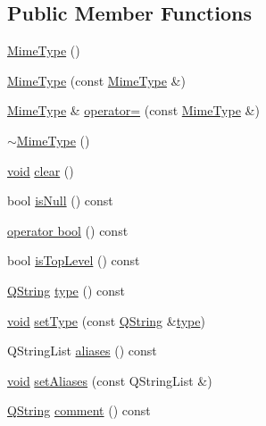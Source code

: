 \subsection*{Public Member Functions}
\begin{DoxyCompactItemize}
\item 
\hyperlink{group___core_plugin_ga4afb222f16010df4252caff7ca264214}{Mime\-Type} ()
\item 
\hyperlink{group___core_plugin_gaf3eef4f7d35c3f1cbf9b6531ad29f3f5}{Mime\-Type} (const \hyperlink{class_core_1_1_mime_type}{Mime\-Type} \&)
\item 
\hyperlink{class_core_1_1_mime_type}{Mime\-Type} \& \hyperlink{group___core_plugin_ga885539378c7538653aa56bc48b16ca48}{operator=} (const \hyperlink{class_core_1_1_mime_type}{Mime\-Type} \&)
\item 
\hyperlink{group___core_plugin_ga81931045febeb757dcd1fd43fb21d5fc}{$\sim$\-Mime\-Type} ()
\item 
\hyperlink{group___u_a_v_objects_plugin_ga444cf2ff3f0ecbe028adce838d373f5c}{void} \hyperlink{group___core_plugin_gae127b4f4a3fe982f3823c5227dd8d490}{clear} ()
\item 
bool \hyperlink{group___core_plugin_ga3b4f946e2b24082d83336ca0ceb7423c}{is\-Null} () const 
\item 
\hyperlink{group___core_plugin_gae84530ba498b22ef7518b0cfa5ac877a}{operator bool} () const 
\item 
bool \hyperlink{group___core_plugin_ga778820a570e278d33abbabe00e3c703d}{is\-Top\-Level} () const 
\item 
\hyperlink{group___u_a_v_objects_plugin_gab9d252f49c333c94a72f97ce3105a32d}{Q\-String} \hyperlink{group___core_plugin_ga4dc87bc5d4687aaa46b634677bdafea5}{type} () const 
\item 
\hyperlink{group___u_a_v_objects_plugin_ga444cf2ff3f0ecbe028adce838d373f5c}{void} \hyperlink{group___core_plugin_ga74d2daccd4e5b7bce1409083a6e0a5f4}{set\-Type} (const \hyperlink{group___u_a_v_objects_plugin_gab9d252f49c333c94a72f97ce3105a32d}{Q\-String} \&\hyperlink{glext_8h_a7d05960f4f1c1b11f3177dc963a45d86}{type})
\item 
Q\-String\-List \hyperlink{group___core_plugin_gaa725def81555bf9742aa4f1de240e033}{aliases} () const 
\item 
\hyperlink{group___u_a_v_objects_plugin_ga444cf2ff3f0ecbe028adce838d373f5c}{void} \hyperlink{group___core_plugin_ga160b1e636202fba5adfd24ad3925b8e2}{set\-Aliases} (const Q\-String\-List \&)
\item 
\hyperlink{group___u_a_v_objects_plugin_gab9d252f49c333c94a72f97ce3105a32d}{Q\-String} \hyperlink{group___core_plugin_ga79389186e4424fcc76067de828c59672}{comment} () const 

\end{DoxyCompactItemize}
